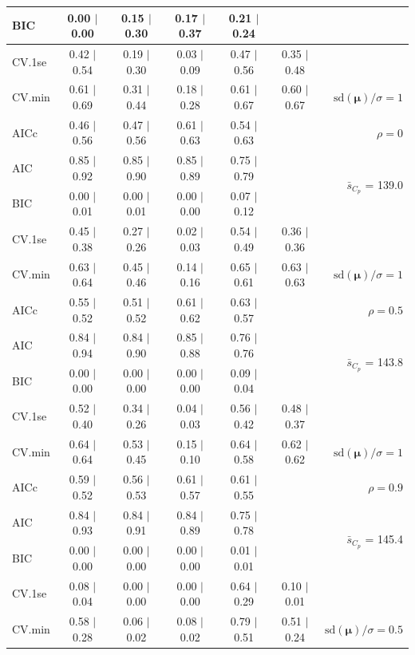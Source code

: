 \documentclass[12pt]{article}
\newcommand{\mr}[1]{\mathrm{#1}}
\newcommand{\bm}[1]{\mathbf{#1}}
\begin{document}
\begin{table}[p]
\begin{center}
\begin{tabular}{l*{5}{c}|r}
BIC & 0.00 $\mid$ 0.00 & 0.15 $\mid$ 0.30 & 0.17 $\mid$ 0.37 & 0.21 $\mid$ 0.24 & & \\
 \hline 
CV.1se & 0.42 $\mid$ 0.54 & 0.19 $\mid$ 0.30 & 0.03 $\mid$ 0.09 & 0.47 $\mid$ 0.56 & 0.35 $\mid$ 0.48 &\\
CV.min & 0.61 $\mid$ 0.69 & 0.31 $\mid$ 0.44 & 0.18 $\mid$ 0.28 & 0.61 $\mid$ 0.67 & 0.60 $\mid$ 0.67 &  $\mr{sd}(\bm{\mu})/\sigma=1$ \\
AICc & 0.46 $\mid$ 0.56 & 0.47 $\mid$ 0.56 & 0.61 $\mid$ 0.63 & 0.54 $\mid$ 0.63 & & $\rho=0$ \\
AIC & 0.85 $\mid$ 0.92 & 0.85 $\mid$ 0.90 & 0.85 $\mid$ 0.89 & 0.75 $\mid$ 0.79 & & \multirow{2}{*}{$\bar{s}_{C_p}$ = 139.0} \\
BIC & 0.00 $\mid$ 0.01 & 0.00 $\mid$ 0.01 & 0.00 $\mid$ 0.00 & 0.07 $\mid$ 0.12 & & \\
 \hline 
CV.1se & 0.45 $\mid$ 0.38 & 0.27 $\mid$ 0.26 & 0.02 $\mid$ 0.03 & 0.54 $\mid$ 0.49 & 0.36 $\mid$ 0.36 &\\
CV.min & 0.63 $\mid$ 0.64 & 0.45 $\mid$ 0.46 & 0.14 $\mid$ 0.16 & 0.65 $\mid$ 0.61 & 0.63 $\mid$ 0.63 &  $\mr{sd}(\bm{\mu})/\sigma=1$ \\
AICc & 0.55 $\mid$ 0.52 & 0.51 $\mid$ 0.52 & 0.61 $\mid$ 0.62 & 0.63 $\mid$ 0.57 & & $\rho=0.5$ \\
AIC & 0.84 $\mid$ 0.94 & 0.84 $\mid$ 0.90 & 0.85 $\mid$ 0.88 & 0.76 $\mid$ 0.76 & & \multirow{2}{*}{$\bar{s}_{C_p}$ = 143.8} \\
BIC & 0.00 $\mid$ 0.00 & 0.00 $\mid$ 0.00 & 0.00 $\mid$ 0.00 & 0.09 $\mid$ 0.04 & & \\
 \hline 
CV.1se & 0.52 $\mid$ 0.40 & 0.34 $\mid$ 0.26 & 0.04 $\mid$ 0.03 & 0.56 $\mid$ 0.42 & 0.48 $\mid$ 0.37 &\\
CV.min & 0.64 $\mid$ 0.64 & 0.53 $\mid$ 0.45 & 0.15 $\mid$ 0.10 & 0.64 $\mid$ 0.58 & 0.62 $\mid$ 0.62 &  $\mr{sd}(\bm{\mu})/\sigma=1$ \\
AICc & 0.59 $\mid$ 0.52 & 0.56 $\mid$ 0.53 & 0.61 $\mid$ 0.57 & 0.61 $\mid$ 0.55 & & $\rho=0.9$ \\
AIC & 0.84 $\mid$ 0.93 & 0.84 $\mid$ 0.91 & 0.84 $\mid$ 0.89 & 0.75 $\mid$ 0.78 & & \multirow{2}{*}{$\bar{s}_{C_p}$ = 145.4} \\
BIC & 0.00 $\mid$ 0.00 & 0.00 $\mid$ 0.00 & 0.00 $\mid$ 0.00 & 0.01 $\mid$ 0.01 & & \\
 \hline 
CV.1se & 0.08 $\mid$ 0.04 & 0.00 $\mid$ 0.00 & 0.00 $\mid$ 0.00 & 0.64 $\mid$ 0.29 & 0.10 $\mid$ 0.01 &\\
CV.min & 0.58 $\mid$ 0.28 & 0.06 $\mid$ 0.02 & 0.08 $\mid$ 0.02 & 0.79 $\mid$ 0.51 & 0.51 $\mid$ 0.24 &  $\mr{sd}(\bm{\mu})/\sigma=0.5$ \\

\end{tabular}
\end{center}
\end{table}
\end{document}
